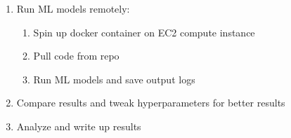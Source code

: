\documentclass[11pt]{article}
\begin{document}
\begin{enumerate}
		\item Run ML models remotely:
		
		\begin{enumerate}
			\item Spin up docker container on EC2 compute instance
			\item Pull code from repo
			\item Run ML models and save output logs
		\end{enumerate}
		
		\item Compare results and tweak hyperparameters for better results
		\item Analyze and write up results
	\end{enumerate}
	
	
	{}
	
	
\end{document}
